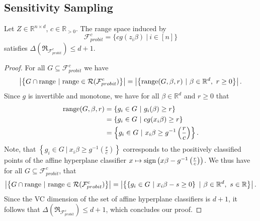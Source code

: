 \subsection{Sensitivity Sampling}



\begin{lemma}
    \label{lemma:vcdim-constant}
    Let $Z \in \mathbb{R}^{n \times d}$, $c \in \mathbb{R}_{>0}$.
    The range space induced by
    $$\mathcal{F}^c_{probit} = \{ c g(z_i \beta) \ | \ i \in [n] \}$$
    satisfies $\Delta(\mathfrak{R}_{\mathcal{F}^c_{probit}}) \leq d + 1$.
\end{lemma}
\begin{proof}
    For all $G \subseteq \mathcal{F}^c_{probit}$ we have
    \begin{equation*}
        \left| \left\{ G \cap \textup{range} \ | \
        \textup{range} \in \mathcal{R}(\mathcal{F}^c_{probit}) \right\} \right|
        =
        \left| \left\{ \textup{range}(G, \beta, r) \ | \
        \beta \in \mathbb{R}^d, \ r \geq 0 \right\} \right|.
    \end{equation*}
    Since $g$ is invertible and monotone, we have for all
    $\beta \in \mathbb{R}^d$ and $r \geq 0$ that
    \begin{align*}
        \textup{range}(G, \beta, r)
         & = \left\{ g_i \in G \ |\ g_i(\beta) \geq r \right\}                                 \\
         & = \left\{ g_i \in G \ |\ c g(x_i \beta) \geq r \right\}                             \\
         & = \left\{ g_i \in G \ |\ x_i \beta \geq g^{-1} \left( \frac{r}{c} \right) \right\}.
    \end{align*}
    Note, that $\left\{ g_i \in G
        \ |\ x_i \beta \geq g^{-1} \left( \frac{r}{c} \right) \right\}$
    corresponds to the positively classified points of the
    affine hyperplane classifier
    $x \mapsto \textup{sign}\left(
        x\beta - g^{-1}\left(\frac{r}{c}\right) \right)$.
    We thus have for all $G \subseteq \mathcal{F}_{probit}^c$, that
    \begin{equation*}
        \left| \left\{ G \cap \textup{range} \ | \
        \textup{range} \in \mathcal{R}(\mathcal{F}^c_{probit}) \right\} \right|
        =
        \left| \left\{ \left\{ g_i \in G
        \ |\ x_i \beta - s \geq 0 \right\} \ | \
        \beta \in \mathbb{R}^d, \ s \in \mathbb{R} \right\} \right|.
    \end{equation*}
    Since the VC dimension of the set of affine hyperplane classifiers is
    $d+1$, it follows that
    $\Delta(\mathfrak{R}_{\mathcal{F}^c_{probit}}) \leq d + 1$,
    which concludes our proof.
\end{proof}

